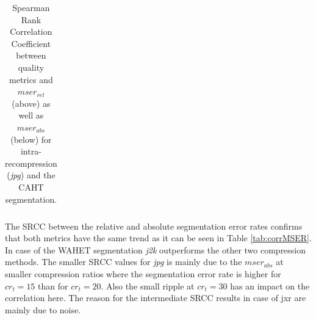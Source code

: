 \documentclass[10pt,twocolumn,letterpaper]{article}
\begin{document}
\begin{table}
\begin{tabular}{ | l || l | l | l | l | l | }
\end{tabular}
\vspace{1mm}
\caption{Spearman Rank Correlation Coefficient between quality metrics and $mser_{rel}$ (above) as well as $mser_{abs}$ (below) for intra-recompression (\emph{jpg}) and the CAHT segmentation.}
\label{tab:corrJPG}
\end{table}



The SRCC between the relative and absolute segmentation error rates confirms that both metrics have the same trend as it can be seen in Table \ref{tab:corrMSER}. In case of the WAHET segmentation \emph{j2k} outperforms the other two compression methods. The smaller SRCC values for \emph{jpg} is mainly due to the $mser_{abs}$ at smaller compression ratios where the segmentation error rate is higher for $cr_t = 15$ than for $cr_t = 20$. Also the small ripple at $cr_t = 30$ has an impact on the correlation here.
The reason for the intermediate SRCC results in case of jxr are mainly due to noise. %
\end{document}
